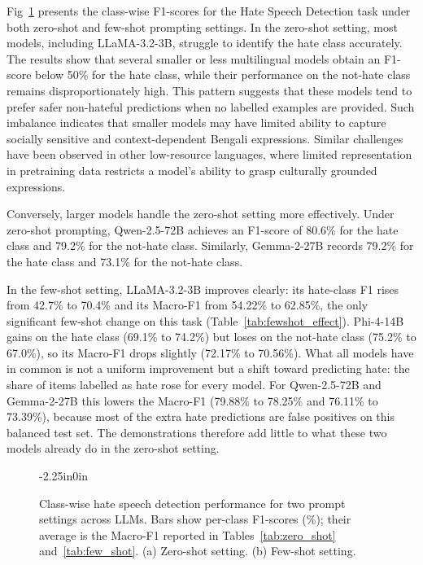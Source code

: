 \documentclass[10pt,letterpaper]{article}
\begin{document}
Fig~\ref{fig:hate_classwise} presents the class-wise F1-scores for the Hate Speech Detection task under both zero-shot and few-shot prompting settings. In the zero-shot setting, most models, including LLaMA-3.2-3B, struggle to identify the hate class accurately. The results show that several smaller or less multilingual models obtain an F1-score below 50\% for the hate class, while their performance on the not-hate class remains disproportionately high. This pattern suggests that these models tend to prefer safer non-hateful predictions when no labelled examples are provided. Such imbalance indicates that smaller models may have limited ability to capture socially sensitive and context-dependent Bengali expressions. Similar challenges have been observed in other low-resource languages, where limited representation in pretraining data restricts a model's ability to grasp culturally grounded expressions.

Conversely, larger models handle the zero-shot setting more effectively. Under zero-shot prompting, Qwen-2.5-72B achieves an F1-score of 80.6\% for the hate class and 79.2\% for the not-hate class. Similarly, Gemma-2-27B records 79.2\% for the hate class and 73.1\% for the not-hate class.

In the few-shot setting, LLaMA-3.2-3B improves clearly: its hate-class F1 rises from 42.7\% to 70.4\% and its Macro-F1 from 54.22\% to 62.85\%, the only significant few-shot change on this task (Table~\ref{tab:fewshot_effect}). Phi-4-14B gains on the hate class (69.1\% to 74.2\%) but loses on the not-hate class (75.2\% to 67.0\%), so its Macro-F1 drops slightly (72.17\% to 70.56\%). What all models have in common is not a uniform improvement but a shift toward predicting hate: the share of items labelled as hate rose for every model. For Qwen-2.5-72B and Gemma-2-27B this lowers the Macro-F1 (79.88\% to 78.25\% and 76.11\% to 73.39\%), because most of the extra hate predictions are false positives on this balanced test set. The demonstrations therefore add little to what these two models already do in the zero-shot setting.

\begin{figure}[t]
\begin{adjustwidth}{-2.25in}{0in}
    \centering
    \caption{Class-wise hate speech detection performance for two prompt settings across LLMs. Bars show per-class F1-scores (\%); their average is the Macro-F1 reported in Tables~\ref{tab:zero_shot} and~\ref{tab:few_shot}. (a) Zero-shot setting. (b) Few-shot setting.}
    \label{fig:hate_classwise}
\end{adjustwidth}
\end{figure}
\end{document}
